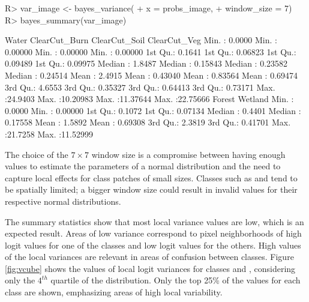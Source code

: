 \documentclass[
  shortnames]{jss}
\begin{document}
\begin{CodeChunk}
\begin{CodeInput}
R> var_image <- bayes_variance(
+     x = probs_image,
+     window_size = 7)
R> bayes_summary(var_image)
\end{CodeInput}
\begin{CodeOutput}
 Water             ClearCut_Burn      ClearCut_Soil      ClearCut_Veg      
 Min.   : 0.0000   Min.   : 0.00000   Min.   : 0.00000   Min.   : 0.00000  
 1st Qu.: 0.1641   1st Qu.: 0.06823   1st Qu.: 0.09489   1st Qu.: 0.09975  
 Median : 1.8487   Median : 0.15843   Median : 0.23582   Median : 0.24514  
 Mean   : 2.4915   Mean   : 0.43040   Mean   : 0.83564   Mean   : 0.69474  
 3rd Qu.: 4.6553   3rd Qu.: 0.35327   3rd Qu.: 0.64413   3rd Qu.: 0.73171  
 Max.   :24.9403   Max.   :10.20983   Max.   :11.37644   Max.   :22.75666  
 Forest            Wetland           
 Min.   : 0.0000   Min.   : 0.00000  
 1st Qu.: 0.1072   1st Qu.: 0.07134  
 Median : 0.4401   Median : 0.17558  
 Mean   : 1.5892   Mean   : 0.69308  
 3rd Qu.: 2.3819   3rd Qu.: 0.41701  
 Max.   :21.7258   Max.   :11.52999  
\end{CodeOutput}
\end{CodeChunk}

The choice of the \(7 \times 7\) window size is a compromise between having enough values to
estimate the parameters of a normal distribution and the need to capture local effects
for class patches of small sizes. Classes such as  and 
tend to be spatially limited; a bigger window size could result in invalid values for
their respective normal distributions.

The summary statistics show that most local variance values are low, which is an expected result. Areas of low variance correspond to pixel neighborhoods of high logit values for one of the classes and low logit values for the others. High values of the local variances are relevant in areas of confusion between classes. Figure \ref{fig:vcube} shows the values of local logit variances for classes  and , considering only the \(4^{th}\) quartile of the distribution. Only the top 25\% of the values for each class are shown, emphasizing areas of high local variability.
\end{document}
